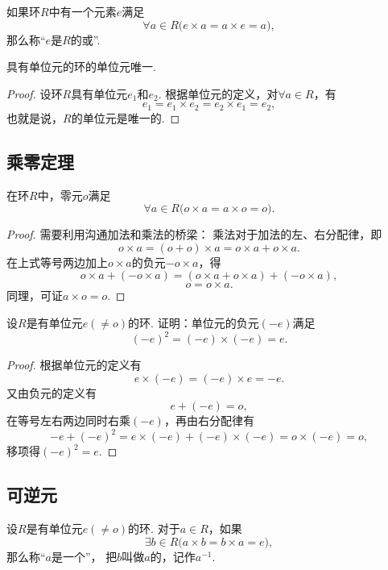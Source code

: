 \begin{definition}
如果环\(R\)中有一个元素\(e\)满足\[
    \forall a \in R \bigl( e \times a = a \times e = a \bigr),
\]
那么称“\(e\)是\(R\)的或”.
\end{definition}

\begin{property}
具有单位元的环的单位元唯一.
\begin{proof}
设环\(R\)具有单位元\(e_1\)和\(e_2\).
根据单位元的定义，对\(\forall a \in R\)，有\[
    e_1 = e_1 \times e_2 = e_2 \times e_1 = e_2,
\]
也就是说，\(R\)的单位元是唯一的.
\end{proof}
\end{property}

\subsection{乘零定理}
\begin{theorem}[乘零定理]
在环\(R\)中，零元\(o\)满足\[
    \forall a \in R \bigl( o \times a = a \times o = o \bigr).
\]
\begin{proof}
需要利用沟通加法和乘法的桥梁：
乘法对于加法的左、右分配律，即\[
    o \times a = (o + o) \times a = o \times a + o \times a.
\]在上式等号两边加上\(o \times a\)的负元\(-o \times a\)，得\[
    o \times a + (- o \times a) = (o \times a + o \times a) + (- o \times a),
\]\[
    o = o \times a.
\]
同理，可证\(a \times o = o\).
\end{proof}
\end{theorem}

\begin{example}
设\(R\)是有单位元\(e(\neq o)\)的环.
证明：单位元的负元\((-e)\)满足\[
    (-e)^2=(-e)\times(-e)=e.
\]
\begin{proof}
根据单位元的定义有\[
    e \times (-e) = (-e) \times e = -e.
\]又由负元的定义有\[
    e + (-e) = o,
\]在等号左右两边同时右乘\((-e)\)，再由右分配律有\[
    -e + (-e)^2 = e \times (-e) + (-e) \times (-e) = o \times (-e) = o,
\]
移项得\((-e)^2 = e\).
\end{proof}
\end{example}

\subsection{可逆元}
\begin{definition}
设\(R\)是有单位元\(e(\neq o)\)的环.
对于\(a \in R\)，如果\[
    \exists b \in R \bigl( a \times b = b \times a = e \bigr),
\]那么称“\(a\)是一个”，
把\(b\)叫做\(a\)的，记作\(a^{-1}\).
\end{definition}

